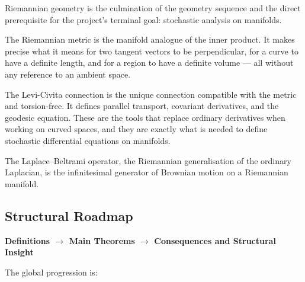 \begin{tcolorbox}[
  colback=gray!6,
  colframe=gray!40,
  arc=2pt,
  left=8pt, right=8pt, top=6pt, bottom=6pt,
  title={\small\textbf{Structural Role: Riemannian Geometry — Intrinsic Metric Structure}},
  fonttitle=\small\bfseries
]
Riemannian geometry is the culmination of the geometry sequence
and the direct prerequisite for the project's terminal goal:
stochastic analysis on manifolds.

The Riemannian metric is the manifold analogue of the inner product.
It makes precise what it means for two tangent vectors to be
perpendicular, for a curve to have a definite length, and for
a region to have a definite volume --- all without any reference
to an ambient space.

The Levi-Civita connection is the unique connection compatible
with the metric and torsion-free.
It defines parallel transport, covariant derivatives, and
the geodesic equation.
These are the tools that replace ordinary derivatives when
working on curved spaces, and they are exactly what is needed
to define stochastic differential equations on manifolds.

The Laplace--Beltrami operator, the Riemannian generalisation
of the ordinary Laplacian, is the infinitesimal generator of
Brownian motion on a Riemannian manifold.
\end{tcolorbox}
\vspace{1em}

\subsection*{Structural Roadmap}

\begin{center}
\textbf{Definitions $\longrightarrow$ Main Theorems
$\longrightarrow$ Consequences and Structural Insight}
\end{center}

The global progression is:

